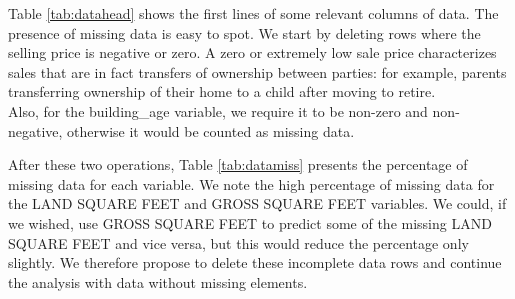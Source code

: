 \documentclass[
]{article}
\begin{document}
Table \ref{tab:datahead} shows the first lines of some relevant columns of data. The presence of missing data is easy to spot. We start by deleting rows where the selling price is negative or zero. A zero or extremely low sale price characterizes sales that are in fact transfers of ownership between parties: for example, parents transferring ownership of their home to a child after moving to retire.\\
Also, for the building\_age variable, we require it to be non-zero and non-negative, otherwise it would be counted as missing data.

\begin{table}[H]
\centering
\caption{\label{tab:datahead}first lines of some relevant columns of data}
\centering
{}
\end{table}

After these two operations, Table \ref{tab:datamiss} presents the percentage of missing data for each variable. We note the high percentage of missing data for the LAND SQUARE FEET and GROSS SQUARE FEET variables. We could, if we wished, use GROSS SQUARE FEET to predict some of the missing LAND SQUARE FEET and vice versa, but this would reduce the percentage only slightly. We therefore propose to delete these incomplete data rows and continue the analysis with data without missing elements.
\end{document}
